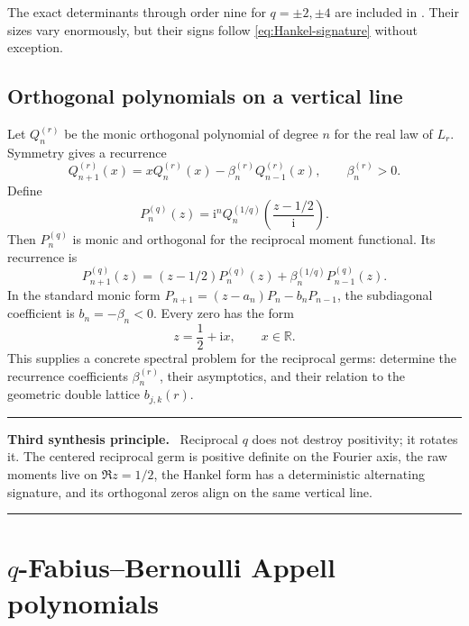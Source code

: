 \documentclass[11pt,oneside]{article}
\numberwithin{equation}{section}
\theoremstyle{definition}
\theoremstyle{remark}
\newcommand{\R}{\mathbb R}
\newcommand{\ii}{\mathrm i}
\newenvironment{resultbox}[1]{%
  \par\medskip\noindent\begin{center}\begin{minipage}{0.94\textwidth}%
  \color{deepgreen}\hrule\vspace{0.65em}%
  \color{black}\textbf{\color{deepgreen}#1.}\ }{%
  \par\vspace{0.65em}\color{deepgreen}\hrule
  \end{minipage}\end{center}\medskip}
\begin{document}
The exact determinants through order nine for $q=\pm2,\pm4$ are included in
.  Their sizes vary enormously,
but their signs follow \eqref{eq:Hankel-signature} without exception.

\subsection{Orthogonal polynomials on a vertical line}

Let $Q_n^{(r)}$ be the monic orthogonal polynomial of degree $n$ for the real
law of $L_r$.  Symmetry gives a recurrence
\begin{equation}
 Q_{n+1}^{(r)}(x)=xQ_n^{(r)}(x)-\beta_n^{(r)}Q_{n-1}^{(r)}(x),
 \qquad \beta_n^{(r)}>0.
 \label{eq:Q-recurrence}
\end{equation}
Define
\begin{equation}
 P_n^{(q)}(z)=\ii^nQ_n^{(1/q)}\!\left(\frac{z-1/2}{\ii}\right).
 \label{eq:vertical-OP}
\end{equation}
Then $P_n^{(q)}$ is monic and orthogonal for the reciprocal moment functional.
Its recurrence is
\begin{equation}
 P_{n+1}^{(q)}(z)
 =(z-1/2)P_n^{(q)}(z)+\beta_n^{(1/q)}P_{n-1}^{(q)}(z).
 \label{eq:P-recurrence}
\end{equation}
In the standard monic form $P_{n+1}=(z-a_n)P_n-b_nP_{n-1}$, the subdiagonal
coefficient is $b_n=-\beta_n<0$.  Every zero has the form
\begin{equation}
 z=\frac12+\ii x,
 \qquad x\in\R.
 \label{eq:vertical-zeros}
\end{equation}
This supplies a concrete spectral problem for the reciprocal germs: determine
the recurrence coefficients $\beta_n^{(r)}$, their asymptotics, and their
relation to the geometric double lattice $b_{j,k}(r)$.

\begin{resultbox}{Third synthesis principle}
Reciprocal $q$ does not destroy positivity; it rotates it.  The centered
reciprocal germ is positive definite on the Fourier axis, the raw moments live
on $\Re z=1/2$, the Hankel form has a deterministic alternating signature,
and its orthogonal zeros align on the same vertical line.
\end{resultbox}

\section[q-Fabius--Bernoulli Appell polynomials]{$q$-Fabius--Bernoulli Appell polynomials}
\label{sec:appell}
\end{document}
